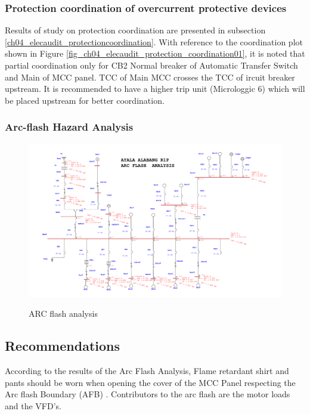 \subsubsection{Protection coordination of overcurrent protective devices}
Results of study on protection coordination are presented in subsection \ref{ch04_elecaudit_protectioncoordination}. With reference to the coordination plot shown in Figure \ref{fig_ch04_elecaudit_protection_coordination01}, it is noted that partial coordination only for CB2 Normal breaker of Automatic Transfer Switch and Main of MCC panel. TCC of Main MCC crosses the TCC of ircuit breaker upstream. It is recommended to have a higher trip unit (Microloggic 6) which will be placed upstream  for better coordination.

\subsubsection{Arc-flash Hazard Analysis }
\begin{figure}
	\includegraphics[scale=0.8, angle =90]{figures/R1P_systemdesign/fig_ch04_elecaudit_ARC1_SLD_Arc_Flash_Analysis.pdf} \\
	\caption{ARC flash analysis}
	\label{fig_ch04_elecaudit_ARC1_SLD_Arc_Flash_Analysis} 
\end{figure}


%	


\subsection{Recommendations}
According to the results of the Arc Flash Analysis, Flame retardant shirt and pants should be worn when opening the cover of the MCC Panel  respecting the Arc flash Boundary (AFB) .  Contributors to the arc flash are the motor loads and the VFD’s.

